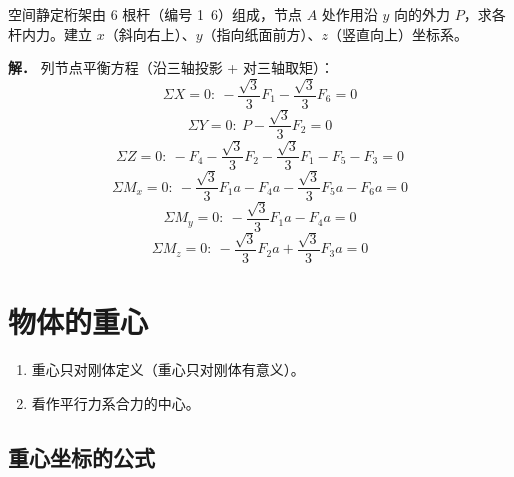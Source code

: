 \begin{example}[求六杆受力]
空间静定桁架由 6 根杆（编号 1~6）组成，节点 $A$ 处作用沿 $y$ 向的外力 $P$，求各杆内力。建立 $x$（斜向右上）、$y$（指向纸面前方）、$z$（竖直向上）坐标系。

\textbf{解．} 列节点平衡方程（沿三轴投影 + 对三轴取矩）：
\begin{equation}
\Sigma X=0:\ -\frac{\sqrt{3}}{3}F_1-\frac{\sqrt{3}}{3}F_6=0
\label{eq:3-例1-平-X}
\end{equation}
\begin{equation}
\Sigma Y=0:\ P-\frac{\sqrt{3}}{3}F_2=0
\label{eq:3-例1-平-Y}
\end{equation}
\begin{equation}
\Sigma Z=0:\ -F_4-\frac{\sqrt{3}}{3}F_2-\frac{\sqrt{3}}{3}F_1-F_5-F_3=0
\label{eq:3-例1-平-Z}
\end{equation}
\begin{equation}
\Sigma M_x=0:\ -\frac{\sqrt{3}}{3}F_1a-F_4a-\frac{\sqrt{3}}{3}F_5a-F_6a=0
\label{eq:3-例1-平-Mx}
\end{equation}
\begin{equation}
\Sigma M_y=0:\ -\frac{\sqrt{3}}{3}F_1a-F_4a=0
\label{eq:3-例1-平-My}
\end{equation}
\begin{equation}
\Sigma M_z=0:\ -\frac{\sqrt{3}}{3}F_2a+\frac{\sqrt{3}}{3}F_3a=0
\label{eq:3-例1-平-Mz}
\end{equation}
\end{example}

\section{物体的重心}

\begin{enumerate}
\item 重心只对刚体定义（重心只对刚体有意义）。
\item 看作平行力系合力的中心。
\end{enumerate}

\subsection{重心坐标的公式}

